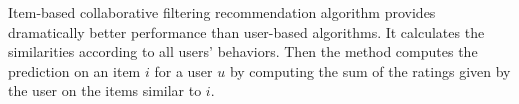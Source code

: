 Item-based collaborative filtering recommendation algorithm
\cite{SarwarKKR01:itembased}
provides dramatically better performance than user-based algorithms.
It calculates the similarities according to all users' behaviors. 
Then the method computes the prediction on an item $i$ for a user $u$ 
by computing the sum of the ratings given by the user on the items similar to $i$.

